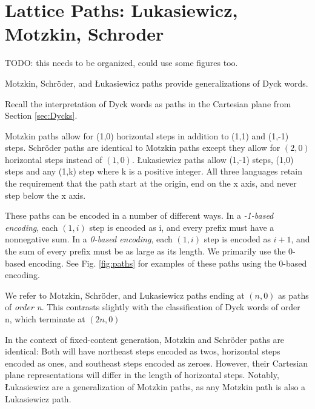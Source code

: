 \chapter{Lattice Paths: Lukasiewicz, Motzkin, Schroder}
TODO: this needs to be organized, could use some figures too.

Motzkin, Schröder, and Łukasiewicz paths provide generalizations of Dyck words.  

Recall the interpretation of Dyck words as paths in the Cartesian plane from Section \ref{sec:Dycks}.

Motzkin paths allow for (1,0) horizontal steps in addition to (1,1) and (1,-1) steps. Schröder paths are identical to Motzkin paths except they allow for $(2,0)$ horizontal steps instead of $(1,0)$.  Łukasiewicz paths allow (1,-1) steps, (1,0) steps and any (1,k) step where k is a positive integer.  All three languages retain the requirement that the path start at the origin, end on the x axis, and never step below the x axis. 

These paths can be encoded in a number of different ways.  In a \emph{-1-based encoding}, each $(1,i)$ step is encoded as i, and every prefix must have a nonnegative sum.  In a \emph{0-based encoding}, each $(1,i)$ step is encoded as $i+1$, and the sum of every prefix must be as large as its length. We primarily use the 0-based encoding. See Fig. \ref{fig:paths}  for examples of these paths using the 0-based encoding.

We refer to Motzkin, Schröder, and Lukasiewicz paths ending at $(n,0)$ as paths of \emph{order n}.  This contrasts slightly with the classification of Dyck words of order n, which terminate at $(2n,0)$

In the context of fixed-content generation, Motzkin and Schröder paths are identical:  Both will have northeast steps encoded as twos, horizontal steps encoded as ones, and southeast steps encoded as zeroes.  However, their Cartesian plane representations will differ in the length of horizontal steps. Notably, Łukasiewicz are a generalization of Motzkin paths, as any Motzkin path is also a Lukasiewicz path.


